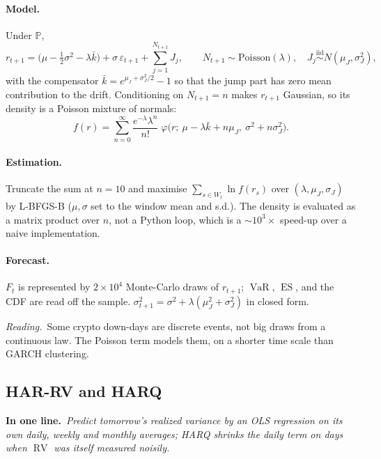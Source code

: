 \documentclass[11pt,a4paper]{article}
\newcommand{\Prob}{\mathbb{P}}
\newcommand{\VaR}{\operatorname{VaR}}
\newcommand{\ES}{\operatorname{ES}}
\newcommand{\RV}{\operatorname{RV}}
\newcommand{\intuition}[1]{\par\smallskip\noindent\textit{Reading.}\ #1\par\smallskip}
\newcommand{\inbrief}[1]{\par\noindent\textbf{In one line.}\ \textit{#1}\par\smallskip}
\begin{document}
\paragraph{Model.} Under $\Prob$,
\begin{equation}
  r_{t+1} = \Big(\mu - \tfrac12\sigma^2 - \lambda\bar k\Big)
          + \sigma\,\varepsilon_{t+1}
          + \sum_{j=1}^{N_{t+1}} J_j,
  \qquad
  N_{t+1}\sim\text{Poisson}(\lambda),\quad J_j\stackrel{\text{iid}}{\sim}N(\mu_J,\sigma_J^2),
\end{equation}
with the compensator $\bar k = e^{\mu_J + \sigma_J^2/2} - 1$ so that the jump
part has zero mean contribution to the drift. Conditioning on $N_{t+1}=n$ makes
$r_{t+1}$ Gaussian, so its density is a Poisson mixture of normals:
\begin{equation}
  f(r) = \sum_{n=0}^{\infty} \frac{e^{-\lambda}\lambda^n}{n!}\;
         \varphi\!\big(r;\ \mu - \lambda\bar k + n\mu_J,\ \sigma^2 + n\sigma_J^2\big).
\end{equation}

\paragraph{Estimation.} Truncate the sum at $n = 10$ and maximise
$\sum_{s\in W_t}\ln f(r_s)$ over $(\lambda,\mu_J,\sigma_J)$ by L-BFGS-B
($\mu,\sigma$ set to the window mean and s.d.). The density is evaluated as a
matrix product over $n$, not a Python loop, which is a $\sim10^3\times$ speed-up
over a naive implementation.

\paragraph{Forecast.} $F_t$ is represented by $2\times10^4$ Monte-Carlo draws of
$r_{t+1}$; $\VaR$, $\ES$, and the CDF are read off the sample.
$\sigma_{t+1}^2 = \sigma^2 + \lambda(\mu_J^2 + \sigma_J^2)$ in closed form.

\intuition{Some crypto down-days are discrete events, not big draws from a
continuous law. The Poisson term models them, on a shorter time scale than
GARCH clustering.}

\subsection{HAR-RV and HARQ}\label{sec:har}

\inbrief{Predict tomorrow's realized variance by an OLS regression on its own
daily, weekly and monthly averages; HARQ shrinks the daily term on days when
$\RV$ was itself measured noisily.}
\end{document}
